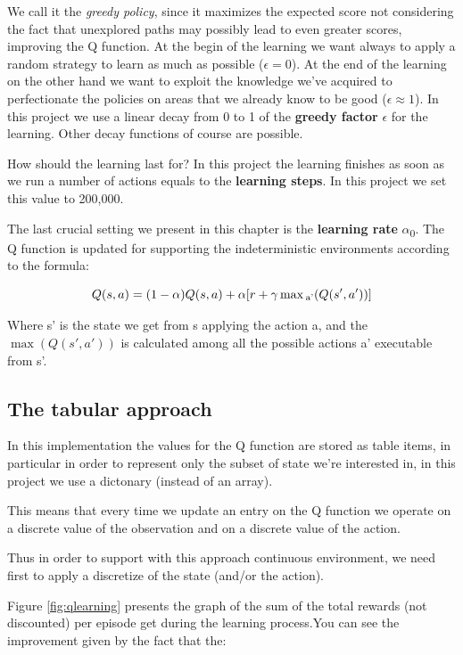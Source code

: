 \documentclass{article}
\begin{document}
We call it the \emph{greedy policy}, since it maximizes the expected score not considering the fact that unexplored paths may
possibly lead to even greater scores, improving the Q function.
At the begin of the learning we want always to apply a random strategy to learn as much as possible ($\epsilon = 0$).
At the end of the learning on the other hand we want to exploit the knowledge we've acquired to perfectionate the policies on areas
that we already know to be good ($\epsilon \approx 1$).
In this project we use a linear decay from 0 to 1 of the \textbf{greedy factor} $\epsilon$ for the learning.
Other decay functions of course are possible.

How should the learning last for? In this project the learning finishes as soon as we run a number of actions
equals to the \textbf{learning steps}. In this project we set this value to 200,000.

The last crucial setting we present in this chapter is the \textbf{learning rate} $\alpha$\textsubscript{0}.
The Q function is updated for supporting the indeterministic environments according to the formula:

\begin{equation}
  Q(s,a) = (1 - \alpha) Q(s,a) + \alpha [r + \gamma \max\textsubscript{a'} (Q(s',a'))]
\end{equation}

Where s' is the state we get from s applying the action a, 
and the $\max (Q(s',a'))$ is calculated among all the possible actions a' executable from s'.

\subsection{The tabular approach}

In this implementation the values for the Q function are stored as table items,
in particular in order to represent only the subset of state we're interested in,  
in this project we use a dictonary (instead of an array).

This means that every time we update an entry on the Q function we operate on a discrete value of the
observation and on a discrete value of the action.

Thus in order to support with this approach continuous environment,
we need first to apply a discretize of the state (and/or the action).

Figure \ref{fig:qlearning} presents the graph of the sum of the total rewards (not discounted) per episode get 
during the learning process.You can see the improvement given by the fact that the:
\end{document}
